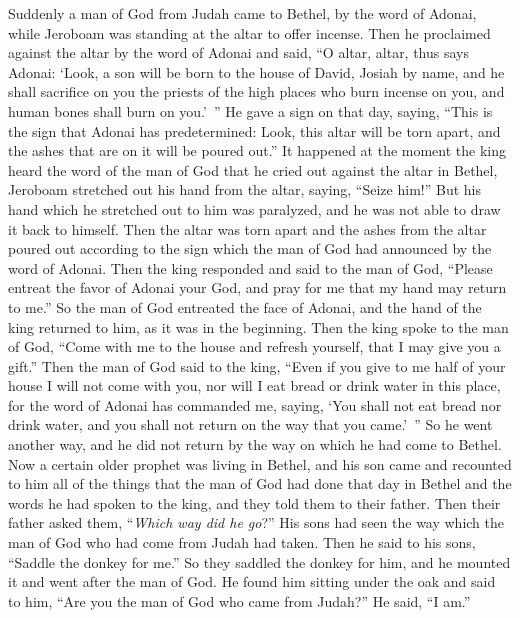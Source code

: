 \begin{biblechapter} %
 Suddenly a man of God from Judah came to Bethel, by the word of Adonai, while Jeroboam was standing at the altar to offer incense.
\verse Then he proclaimed against the altar by the word of Adonai and said, “O altar, altar, thus says Adonai: ‘Look, a son will be born to the house of David, Josiah by name, and he shall sacrifice on you the priests of the high places who burn incense on you, and human bones shall burn on you.’ ”
\verse He gave a sign on that day, saying, “This is the sign that Adonai has predetermined: Look, this altar will be torn apart, and the ashes that are on it will be poured out.”
\verse It happened at the moment the king heard the word of the man of God that he cried out against the altar in Bethel, Jeroboam stretched out his hand from the altar, saying, “Seize him!” But his hand which he stretched out to him was paralyzed, and he was not able to draw it back to himself.
\verse Then the altar was torn apart and the ashes from the altar poured out according to the sign which the man of God had announced by the word of Adonai.
\verse Then the king responded and said to the man of God, “Please entreat the favor of Adonai your God, and pray for me that my hand may return to me.” So the man of God entreated the face of Adonai, and the hand of the king returned to him, as it was in the beginning.
\verse Then the king spoke to the man of God, “Come with me to the house and refresh yourself, that I may give you a gift.”
\verse Then the man of God said to the king, “Even if you give to me half of your house I will not come with you, nor will I eat bread or drink water in this place,
\verse for the word of Adonai has commanded me, saying, ‘You shall not eat bread nor drink water, and you shall not return on the way that you came.’ ”
\verse So he went another way, and he did not return by the way on which he had come to Bethel.
 Now a certain older prophet was living in Bethel, and his son came and recounted to him all of the things that the man of God had done that day in Bethel and the words he had spoken to the king, and they told them to their father.
\verse Then their father asked them, “\textit{Which way did he go}?” His sons had seen the way which the man of God who had come from Judah had taken.
\verse Then he said to his sons, “Saddle the donkey for me.” So they saddled the donkey for him, and he mounted it
\verse and went after the man of God. He found him sitting under the oak and said to him, “Are you the man of God who came from Judah?” He said, “I am.”

\end{biblechapter}
